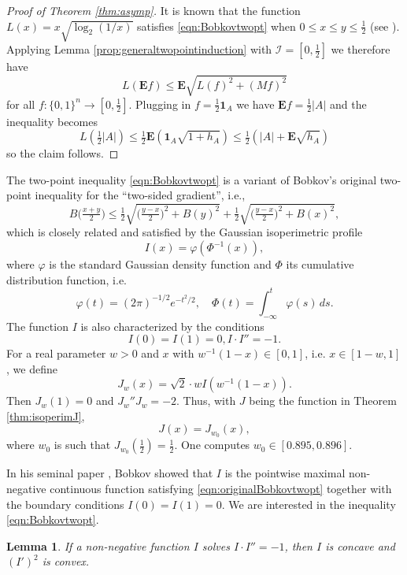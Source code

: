 \documentclass[12pt]{amsart}
\theoremstyle{plain}
\newtheorem{lem}[thm]{Lemma}
\theoremstyle{definition}
\theoremstyle{remark}
\numberwithin{equation}{section}
\begin{document}
\begin{proof}[Proof of Theorem \ref{thm:asymp}]
It is known that the function $L(x)=x\sqrt{\log_2(1/x)}$ satisfies \eqref{eqn:Bobkovtwopt} when $0\le x\le y\le \frac12$ (see \cite[Lemma 2.2]{BIM23}). 
Applying Lemma \ref{prop:generaltwopointinduction} with $\mathcal{I}=[0,\frac12]$ we therefore have
\[ L(\mathbf{E} f)\le \mathbf{E} \sqrt{ L(f)^2 + (Mf)^2} \]
for all $f:\{0,1\}^n\to [0,\frac12]$.
Plugging in $f=\frac12 \mathbf{1}_A$ we have $\mathbf{E} f=\frac12 |A|$ and the inequality becomes
\[ L(\tfrac12|A|) \le \tfrac12 \mathbf{E} (\mathbf{1}_A \sqrt{1 + h_A})\le \tfrac12 (|A| +  \mathbf{E} \sqrt{h_A}) \]
so  the claim follows.
\end{proof}

The two-point inequality \eqref{eqn:Bobkovtwopt} is a variant of Bobkov's  original two-point inequality \cite{Bob97} for the ``two-sided gradient'', i.e., 
\begin{equation}\label{eqn:originalBobkovtwopt}
B\Big(\tfrac{x+y}{2}\Big) \le \tfrac12 \sqrt{\Big(\tfrac{y-x}2\Big)^2 + B(y)^2} + \tfrac12 \sqrt{\Big(\tfrac{y-x}2\Big)^2 + B(x)^2},
\end{equation}
which is closely related and satisfied by the Gaussian isoperimetric profile \cite{Bob97}
\[ I(x) = \varphi(\Phi^{-1}(x)), \]
where $\varphi$ is the standard Gaussian density function and $\Phi$ its cumulative distribution function, i.e.
\[ \varphi(t) = (2\pi)^{-1/2} e^{-t^2/2},\quad \Phi(t) = \int_{-\infty}^t \varphi(s)\,ds.  \]
The function $I$ is also characterized by the conditions 
\[ I(0)=I(1)=0, I\cdot I''=-1. \]
For a real parameter $w>0$ and $x$ with $w^{-1}(1-x)\in [0,1]$, i.e. $x\in [1-w,1]$, we define
\[ J_w(x) = \sqrt{2}\cdot w I(w^{-1}(1-x)). \]
Then $J_w(1)=0$ and $J_w''J_w=-2$. Thus, with $J$ being the function in Theorem \ref{thm:isoperimJ},
\begin{equation}\label{eqn:JintermsofI}
J(x) = J_{w_0}(x),
\end{equation}
where $w_0$ is such that $J_{w_0}(\frac12)=\frac12$. One computes $w_0\in [0.895, 0.896]$.



In his seminal paper \cite{Bob97}, Bobkov showed that $I$ is the  pointwise maximal non-negative continuous function  satisfying \eqref{eqn:originalBobkovtwopt} together with the boundary conditions $I(0)=I(1)=0$.
We are interested in the inequality \eqref{eqn:Bobkovtwopt}.

\begin{lem}\label{lem:Iprimesqconvex}
If a non-negative function $I$ solves $I\cdot I''=-1$, then $I$ is concave and $(I')^2$ is convex.
\end{lem}
\end{document}
